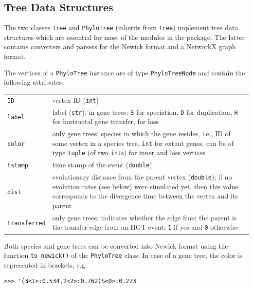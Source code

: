 \documentclass[hidelinks,11pt]{article}
\newcommand{\sq}{\textquotesingle}
\begin{document}
\subsection{Tree Data Structures}

The two classes \texttt{Tree} and \texttt{PhyloTree} (inherits from \texttt{Tree}) implement tree data structures which are essential for most of the modules in the package.
The latter contains converters and parsers for the Newick format and a NetworkX graph format.

The vertices of a \texttt{PhyloTree} instance are of type \texttt{PhyloTreeNode} and contain the following attributes:

\vspace{3mm}
\renewcommand{\arraystretch}{1.5}

{\small\centering
\begin{longtable}{ p{3.0cm} p{10cm} }
	\texttt{ID} & vertex ID (\texttt{int})\\
	\texttt{label}  & label (\texttt{str}), in gene trees: \texttt{\sq S\sq} for
	speciation, \texttt{\sq D\sq} for duplication, \texttt{\sq H\sq} for
	horizontal gene transfer, \texttt{\sq *\sq} for loss\\
	\texttt{color} & only gene trees; species in which the gene resides, i.e., ID of some vertex in a species tree, \texttt{int} for extant genes, can be of type \texttt{tuple} (of two \texttt{int}s) for inner and loss vertices\\
	\texttt{tstamp} & time stamp of the event (\texttt{double})\\
	\texttt{dist} & evolutionary distance from the parent vertex 
	(\texttt{double}); if no evolution rates (see below) were simulated yet, then 
	this value corresponds to the divergence time between the vertex and its 
	parent\\
	\texttt{transferred} & only gene trees; indicates whether the edge from the 
	parent is the transfer edge from an HGT event; \texttt{1} if yes and 
	\texttt{0} otherwise \\
\end{longtable}
}
\vspace{3mm}

Both species and gene trees can be converted into Newick format using the function \texttt{to\_newick()} of the \texttt{PhyloTree} class.
In case of a gene tree, the color is represented in brackets, e.g.

\begin{adjustwidth}{1cm}{1cm}\vspace{2mm}
\begin{verbatim}
>>> '(3<1>:0.534,2<2>:0.762)S<0>:0.273'
\end{verbatim}
\end{adjustwidth}
\end{document}
